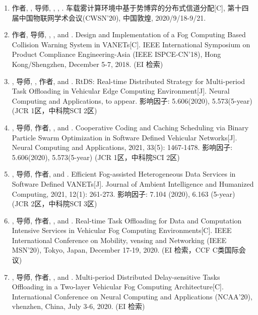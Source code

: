 \begin{enumerate}
	\item 作者\textbf{}, , 导师, , , . 车载雾计算环境中基于势博弈的分布式信道分配[C], 第十四届中国物联网学术会议(CWSN’20), 中国敦煌, 2020/9/18-9/21.
	\item 作者\textbf{}, 导师, , ,  and . Design and Implementation of a Fog Computing Based Collision Warning System in VANETs[C]. IEEE International Symposium on Product Compliance Engineering-Asia (IEEE ISPCE-CN’18), Hong Kong/Shengzhen, December 5-7, 2018. (EI 检索)
	\item {}, 导师, , 作者\textbf{},  and . RtDS: Real-time Distributed Strategy for Multi-period Task Offloading in Vehicular Edge Computing Environment[J]. Neural Computing and Applications, to appear. 影响因子: 5.606(2020), 5.573(5-year) (JCR 1区，中科院SCI 2区)
	\item {}, 导师, 作者\textbf{}, ,  and . Cooperative Coding and Caching Scheduling via Binary Particle Swarm Optimization in Software Defined Vehicular Networks[J]. Neural Computing and Applications, 2021, 33(5): 1467-1478. 影响因子: 5.606(2020), 5.573(5-year) (JCR 1区，中科院SCI 2区)
	\item {}, 导师, 作者\textbf{},  and . Efficient Fog-assisted Heterogeneous Data Services in Software Defined VANETs[J]. Journal of Ambient Intelligence and Humanized Computing, 2021, 12(1): 261-273. 影响因子: 7.104 (2020), 6.163 (5-year) (JCR 2区，中科院SCI 3区)
	\item {}, 导师, 作者\textbf{}, ,  and . Real-time Task Offloading for Data and Computation Intensive Services in Vehicular Fog Computing Environments[C]. IEEE International Conference on Mobility, vensing and Networking (IEEE MSN’20), Tokyo, Japan, December 17-19, 2020. (EI 检索，CCF C类国际会议)
	\item {}, 导师, 作者\textbf{}, ,  and . Multi-period Distributed Delay-sensitive Tasks Offloading in a Two-layer Vehicular Fog Computing Architecture[C]. International Conference on Neural Computing and Applications (NCAA’20), vhenzhen, China, July 3-6, 2020. (EI 检索)

\end{enumerate}
